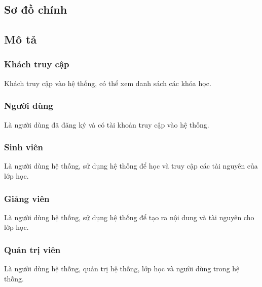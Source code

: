 \documentclass[./../main_file.tex]{subfiles}
\begin{document}
\subsection{Sơ đồ chính}

\begin{figure}[h!]
	\centering
	\resizebox{1.2\textwidth}{!}{}
\end{figure}

\subsection{Mô tả}
	\subsubsection{Khách truy cập}
	Khách truy cập vào hệ thống, có thể xem danh sách các khóa học.
	
	\subsubsection{Người dùng}
	Là người dùng đã đăng ký và có tài khoản truy cập vào hệ thống.
	
	\subsubsection{Sinh viên}
	Là người dùng hệ thống, sử dụng hệ thống để học và truy cập các tài nguyên của lớp học.
	
	\subsubsection{Giảng viên}
	Là người dùng hệ thống, sử dụng hệ thống để tạo ra nội dung và tài nguyên cho lớp học.
	
	\subsubsection{Quản trị viên}
	Là người dùng hệ thống, quản trị hệ thống, lớp học và người dùng trong hệ thống.
	
	
\end{document}
